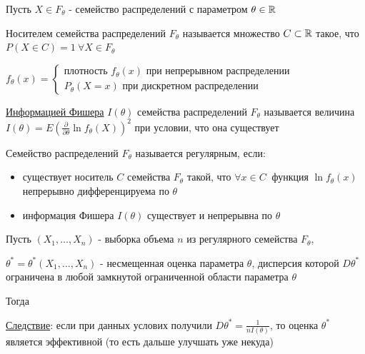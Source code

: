 \documentclass[12pt]{article}
\begin{document}
\begin{enumerate}
    Пусть $X \in F_\theta$ - семейство распределений с параметром $\theta \in \mathbb{R}$

    \Def Носителем семейства распределений $F_\theta$ называется множество $C \subset \mathbb{R}$
    такое, что $P(X \in C) = 1 \ \forall X \in F_\theta$

    $f_\theta(x) = \begin{cases}
        \text{плотность } f_\theta(x) \text{ при непрерывном распределении} \\
        P_\theta(X = x) \text{ при дискретном распределении}
    \end{cases}$

    \Def \hyperlink{fishers_information}{Информацией Фишера} $I(\theta)$ семейства распределений $F_\theta$ называется величина 
    $I(\theta) = E\left(\frac{\partial}{\partial \theta} \ln f_\theta(X)\right)^2$ при условии, что
    она существует

    \Def Семейство распределений $F_\theta$ называется регулярным, если:

    \begin{itemize}
        \item существует носитель $C$ семейства $F_\theta$ такой, что $\forall x \in C \ $ функция $\ln f_\theta(x)$ непрерывно дифференцируема по $\theta$
        \item информация Фишера $I(\theta)$ существует и непрерывна по $\theta$
    \end{itemize}

    \begin{MyTheorem}
         Пусть $(X_1, \dots, X_n)$ - выборка объема $n$ из регулярного семейства $F_\theta$,

        $\theta^* = \theta^*(X_1, \dots, X_n)$ - несмещенная оценка параметра $\theta$, дисперсия которой
        $D\theta^*$ ограничена в любой замкнутой ограниченной области параметра $\theta$

        Тогда 
    \end{MyTheorem}

    \underline{Следствие}: если при данных услових получили $D\theta^* = \frac{1}{n I(\theta)}$, то оценка $\theta^*$ является эффективной 
    (то есть дальше улучшать уже некуда)


\end{enumerate}
\end{document}
